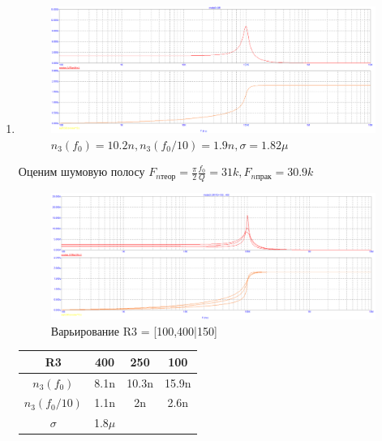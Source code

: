 \documentclass[a4paper, 12pt]{article}%
\begin{document}
\begin{enumerate}

\item

\begin{figure}[h!]
    \centering
    \includegraphics[scale=0.3]{images/mod3_3_1.png}
    \caption{$n_3(f_0) = 10.2n, n_3(f_0/10) = 1.9n, \sigma = 1.82\mu$}
    \label{fig:m331}
\end{figure}

Оценим шумовую полосу $F_{n\text{теор}} = \frac{\pi}{2}\frac{f_0}{Q} = 31k, F_{n\text{прак}} = 30.9k$

\begin{figure}[h!]
    \centering
    \includegraphics[scale=0.3]{images/mod3_3_2_1.png}
    \caption{Варьирование R3 = [100,400|150]}
    \label{fig:m3321}
\end{figure}

\begin{center}
\begin{tabular}{|c|c|c|c|}
\hline
    R3 & 400 & 250 & 100\\ \hline
    $n_3(f_0)$ & 8.1n & 10.3n & 15.9n\\ \hline
    $n_3(f_0/10)$ & 1.1n & 2n & 2.6n\\ \hline
    $\sigma$ & 1.8$\mu$ & &\\ \hline
\end{tabular}
\end{center}


\end{enumerate}
\end{document}
